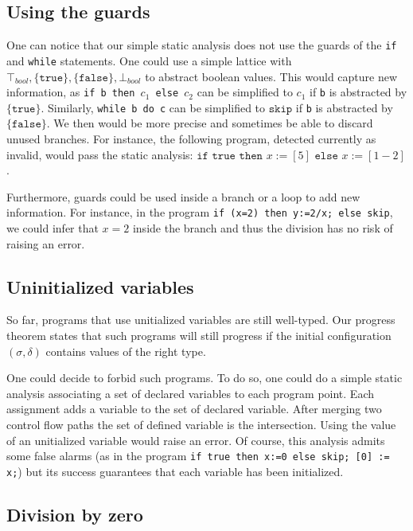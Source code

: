 \subsection*{Using the guards}
One can notice that our simple static analysis does not use the guards of the \texttt{if} and \texttt{while} statements. One could use a simple lattice with $\top_{bool}, \lbrace \texttt{true} \rbrace, \lbrace \texttt{false} \rbrace, \bot_{bool}$ to abstract boolean values. This would capture new information, as \texttt{if b then $c_1$ else $c_2$} can be simplified to $c_1$ if \texttt{b} is abstracted by $\lbrace \texttt{true} \rbrace$.
Similarly, \texttt{while b do c} can be simplified to $\texttt{skip}$ if \texttt{b} is abstracted by $\lbrace \texttt{false} \rbrace$.
We then would be more precise and sometimes be able to discard unused branches.
For instance, the following program, detected currently as invalid, would pass the static analysis: $\texttt{if true then~} x:= [5] \texttt{~else~} x:= [1 - 2]$.

Furthermore, guards could be used inside a branch or a loop to add new information. For instance, in the program \texttt{if (x=2) then y:=2/x; else skip}, we could infer that $x=2$ inside the branch and thus the division has no risk of raising an error.

\subsection*{Uninitialized variables}

So far, programs that use unitialized variables are still well-typed. Our progress theorem states that such programs will still progress if the initial configuration $(\sigma,\delta)$ contains values of the right type.

One could decide to forbid such programs. To do so, one could do a simple static analysis associating a set of declared variables to each program point. Each assignment adds a variable to the set of declared variable. After merging two control flow paths the set of defined variable is the intersection. Using the value of an unitialized variable would raise an error. Of course, this analysis admits some false alarms (as in the program \texttt{if true then x:=0 else skip; [0] := x;}) but its success guarantees that each variable has been initialized. 

\subsection*{Division by zero}

